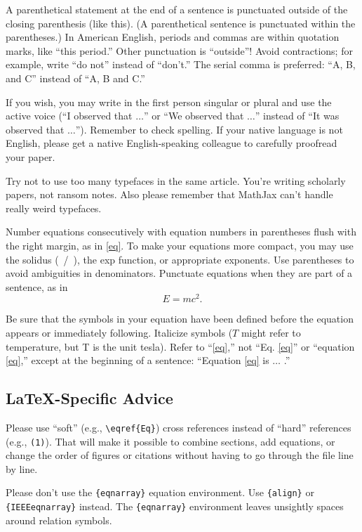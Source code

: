 \documentclass[journal,twoside,web]{ieeecolor2}
\begin{document}
A parenthetical statement at the end of a sentence is punctuated outside of 
the closing parenthesis (like this).
(A parenthetical sentence is punctuated 
within the parentheses.) In American English, periods and commas are within 
quotation marks, like ``this period.'' Other punctuation is ``outside''! 
Avoid contractions; for example, write ``do not'' instead of ``don't.'' The 
serial comma is preferred: ``A, B, and C'' instead of ``A, B and C.''

If you wish, you may write in the first person singular or plural and use 
the active voice (``I observed that $\ldots$'' or ``We observed that $\ldots$'' 
instead of ``It was observed that $\ldots$'').
Remember to check spelling.
If 
your native language is not English, please get a native English-speaking 
colleague to carefully proofread your paper.

Try not to use too many typefaces in the same article.
You're writing
scholarly papers, not ransom notes.
Also please remember that MathJax
can't handle really weird typefaces.

Number equations consecutively with equation numbers in parentheses flush 
with the right margin, as in \eqref{eq}.
To make your equations more 
compact, you may use the solidus (~/~), the exp function, or appropriate 
exponents.
Use parentheses to avoid ambiguities in denominators.
Punctuate 
equations when they are part of a sentence, as in
\begin{equation}E=mc^2.\label{eq}\end{equation}

Be sure that the symbols in your equation have been defined before the 
equation appears or immediately following.
Italicize symbols ($T$ might refer 
to temperature, but T is the unit tesla).
Refer to ``\eqref{eq},'' not ``Eq.
\eqref{eq}'' 
or ``equation \eqref{eq},'' except at the beginning of a sentence: ``Equation \eqref{eq} 
is $\ldots$ .''

\subsection{\LaTeX-Specific Advice}

Please use ``soft'' (e.g., \verb|\eqref{Eq}|) cross references instead
of ``hard'' references (e.g., \verb|(1)|).
That will make it possible
to combine sections, add equations, or change the order of figures or
citations without having to go through the file line by line.

Please don't use the \verb|{eqnarray}| equation environment.
Use
\verb|{align}| or \verb|{IEEEeqnarray}| instead.
The \verb|{eqnarray}|
environment leaves unsightly spaces around relation symbols.
\end{document}
